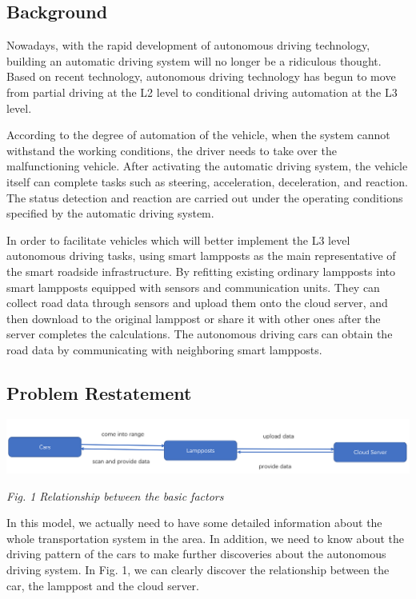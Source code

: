 \documentclass[12pt]{article}
\theoremstyle{definition}
\theoremstyle{remark}
\numberwithin{equation}{section}
\begin{document}
		\subsection{Background}
		Nowadays, with the rapid development of autonomous driving technology, building an automatic driving system will no longer be a ridiculous thought. Based on recent technology, autonomous driving technology has begun to move from partial driving at the L2 level to conditional driving automation at the L3 level.
		
		According to the degree of automation of the vehicle\cite{Autonomous Driving Levels}, when the system cannot withstand the working conditions, the driver needs to take over the malfunctioning vehicle. After activating the automatic driving system, the vehicle itself can complete tasks such as steering, acceleration, deceleration, and reaction. The status detection and reaction are carried out under the operating conditions specified by the automatic driving system.
		
		In order to facilitate vehicles which will better implement the L3 level autonomous driving tasks, using smart lampposts as the main representative of the smart roadside infrastructure. By refitting existing ordinary lampposts into smart lampposts equipped with sensors and communication units. They can collect road data through sensors and upload them onto the cloud server, and then download to the original lamppost or share it with other ones after the server completes the calculations. The autonomous driving cars can obtain the road data by communicating with neighboring smart lampposts.
		
		\subsection{Problem Restatement}
		\begin{center}
			\includegraphics[width=14cm]{1.png}
			
			\small \textit{Fig. 1 Relationship between the basic factors}			
		\end{center}
	
		In this model, we actually need to have some detailed information about the whole transportation system in the area. In addition, we need to know about the driving pattern of the cars to make further discoveries about the autonomous driving system. In Fig. 1, we can clearly discover the relationship between the car, the lamppost and the cloud server.
		
\end{document}
